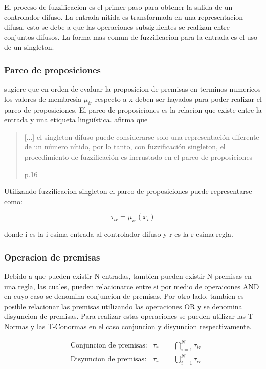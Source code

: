             El proceso de fuzzificacion es el primer paso para obtener la salida de un controlador difuso. La entrada nitida es transformada en una representacion difusa, esto se debe a que las operaciones subsiguientes se realizan entre conjuntos difusos. La forma mas comun de fuzzificacion para la entrada es el uso de un singleton.
            
        \subsubsection{Pareo de proposiciones}
            
            \textcite{riid2003transparent} sugiere que en orden de evaluar la proposicion de premisas en terminos numericos los valores de membresia $\mu_{ir}$ respecto a x deben ser hayados para poder realizar el pareo de proposiciones. El pareo de proposiciones es la relacion que existe entre la entrada y una etiqueta lingüística. \textcite{riid2003transparent} afirma que \blockquote[p.16]{[...] el singleton difuso puede considerarse solo una representación diferente de un número nítido, por lo tanto, con fuzzificación singleton, el procedimiento de fuzzificación es incrustado en el pareo de proposiciones}. Utilizando fuzzificacion singleton el pareo de proposiciones puede representarse como:

            \begin{equation}\label{eq:preposiciones}
                \tau_{ir} = \mu_{ir}(x_i)
            \end{equation}

            \noindent donde i es la i-esima entrada al controlador difuso y r es la r-esima regla.
            
        \subsubsection{Operacion de premisas}
            
            Debido a que pueden existir N entradas, tambien pueden existir N premisas en una regla, las cuales, pueden relacionarce entre si por medio de operaicones AND en cuyo caso se denomina conjuncion de premisas. Por otro lado, tambien es posible relacionar las premisas utilizando las operaciones OR y se denomina disyuncion de premisas. Para realizar estas operaciones se pueden utilizar las T-Normas y las T-Conormas en el caso conjuncion y disyuncion respectivamente.

            \begin{align}
                &\text{Conjuncion de premisas:} & \tau_{r} &= \bigcap_{i=1}^{N}\tau_{ir} \label{eq:conjP} \\
                &\text{Disyuncion de premisas:} & \tau_{r} &= \bigcup_{i=1}^{N}\tau_{ir} \label{eq:disyP}
            \end{align}

